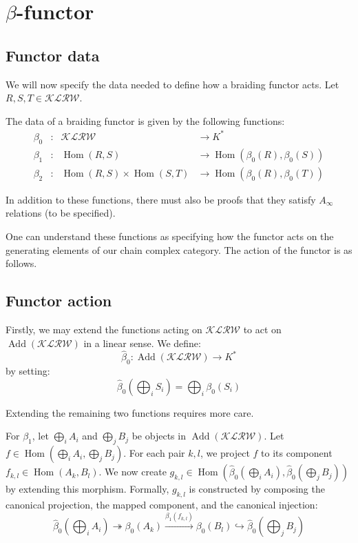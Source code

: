 \section{$\beta$-functor}


\subsection{Functor data}
We will now specify the data needed to define how a braiding functor acts. Let $R, S, T \in \mathcal{KLRW}$.

The data of a braiding functor is given by the following functions:
$$
\begin{aligned}
\beta_0 &\colon & \mathcal{KLRW} &\to K^* \\
\beta_1 &\colon & \operatorname{Hom}(R,S) &\to \operatorname{Hom}(\beta_0(R), \beta_0(S)) \\
\beta_2 &\colon & \operatorname{Hom}(R,S) \times \operatorname{Hom}(S,T) &\to \operatorname{Hom}(\beta_0(R), \beta_0(T))
\end{aligned}
$$

In addition to these functions, there must also be proofs that they satisfy $A_\infty$ relations (to be specified).

One can understand these functions as specifying how the functor acts on the generating elements of our chain complex category. The action of the functor is as follows.

\subsection{Functor action}
Firstly, we may extend the functions acting on $\mathcal{KLRW}$ to act on $\operatorname{Add}(\mathcal{KLRW})$ in a linear sense. We define:
$$\widehat{\beta}_0 \colon \operatorname{Add}(\mathcal{KLRW}) \to K^*$$
by setting:
$$\widehat{\beta}_0\left(\bigoplus_i S_i\right) = \bigoplus_i \beta_0(S_i)$$

Extending the remaining two functions requires more care.

For $\beta_1$, let $\bigoplus_i A_i$ and $\bigoplus_j B_j$ be objects in $\operatorname{Add}(\mathcal{KLRW})$. Let $f \in \operatorname{Hom}\left(\bigoplus_i A_i, \bigoplus_j B_j\right)$. For each pair $k, l$, we project $f$ to its component $f_{k,l} \in \operatorname{Hom}(A_k, B_l)$. We now create $g_{k,l} \in \operatorname{Hom}\left(\widehat{\beta}_0\left(\bigoplus_i A_i\right), \widehat{\beta}_0\left(\bigoplus_j B_j\right)\right)$ by extending this morphism. Formally, $g_{k,l}$ is constructed by composing the canonical projection, the mapped component, and the canonical injection:
$$\widehat{\beta}_0\left(\bigoplus_i A_i\right) \twoheadrightarrow {\beta}_0(A_k) \xrightarrow{\beta_1(f_{k,l})} {\beta}_0(B_l) \hookrightarrow \widehat{\beta}_0\left(\bigoplus_j B_j\right)$$



